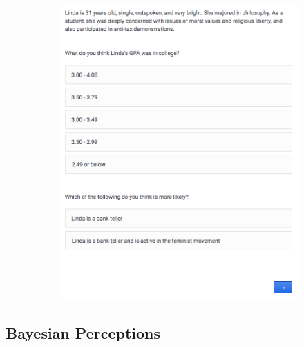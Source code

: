 \documentclass[12pt, letterpaper]{article}
\begin{document}
\begin{figure}[h!]
\begin{subfigure}[t]{0.48\textwidth}
	\includegraphics[width=1\textwidth]{../figs/vig_linda.png}
	\caption{}
\end{subfigure}
\end{figure}

\clearpage

\subsection{Bayesian Perceptions}
\end{document}
